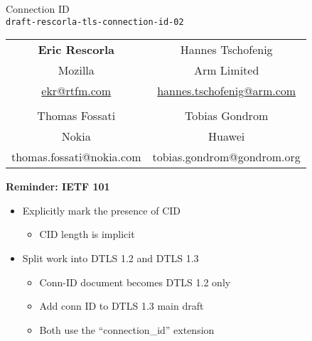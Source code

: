 \documentclass[helvetica]{seminar}
\newcommand{\heading}[1]{%
  \begin{center} 
    \large\bf 
    #1 
  \end{center} 
  \vspace{.4 in}}
\begin{document}
\begin{slide}
\begin{center}
\vspace{.5 in}
\LARGE{{\bf}Connection ID\\{\small \verb^draft-rescorla-tls-connection-id-02^}}\\
\vspace{.2in}
{\small
\begin{tabular}{c c}
\textbf{Eric Rescorla} & Hannes Tschofenig \\
Mozilla& Arm Limited \\ 
  \url{ekr@rtfm.com} & \url{hannes.tschofenig@arm.com} \\
  \\
  Thomas Fossati & Tobias Gondrom \\
  Nokia & Huawei \\
  thomas.fossati@nokia.com & tobias.gondrom@gondrom.org \\
  \end{tabular}

}

\end{center}
\end{slide}

\centerslidesfalse 

\begin{slide}
  \heading{Reminder: IETF 101}

  \begin{itemize}
  \item Explicitly mark the presence of CID
    \begin{itemize}
    \item CID length is implicit
    \end{itemize}
  \item Split work into DTLS 1.2 and DTLS 1.3
    \begin{itemize}
    \item Conn-ID document becomes DTLS 1.2 only
    \item Add conn ID to DTLS 1.3 main draft
    \item Both use the ``connection\_id'' extension
    \end{itemize}
  \end{itemize}
\end{slide}
\end{document}

